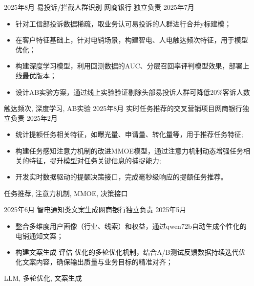 %
%


 
\begin{experiences}
			
 \experience
    {2025年8月}   {易投诉/拦截人群识别} {网商银行} {独立负责}
    {2025年7月} {
                      \begin{itemize}
                        \item 针对工信部投诉数据稀疏，取业务认可易投诉的人群进行合并y标建模；
                        \item 在客户特征基础上，针对电销场景，构建智电、人电触达频次特征，用于模型优化；
                        \item 构建深度学习模型，利用回测数据的AUC、分层召回率评判模型效果，部署上线最优版本；
                        \item 设计AB实验方案，通过线上实验验证剔除头部易投诉人群可降低20\%客诉人数                                                                                        
                      \end{itemize}
                    }
                    {触达频次, 深度学习, AB实验}
  \emptySeparator
  \experience
    { 2025年8月} {实时任务推荐的交叉营销项目}{网商银行}{独立负责}
    {2025年2月}    {
                      \begin{itemize}
                        \item 统计提额任务相关特征，如曝光量、申请量、转化量等，用于推荐任务特征; 
                        \item 构建任务感知注意力机制的改进MMOE模型，通过注意力机制动态增强任务相关的特征，提升模型对任务关键信息的捕捉能力;
                        \item 开发实时数据驱动的提额决策接口，完成毫秒级响应的提额任务推荐。                                                                                         
                      \end{itemize}
                    }
                    {任务推荐, 注意力机制, MMOE, 决策接口}
	
  \emptySeparator
  \experience
  {2025年6月} {智电通知类文案生成}{网商银行}{独立负责}
  {2025年5月 }    {
				  	\begin{itemize}
				  		\item 整合多维度用户画像（行业、线索）和权益，通过qwen72b自动生成个性化的电销通知文案；
				  		\item 构建文案生成-评估-优化的多轮优化机制，结合A/B测试反馈数据持续迭代优化文案内容，确保输出质量与业务目标的精准对齐；
				  	\end{itemize}
				  }
				  {LLM, 多轮优化, 文案生成}


\end{experiences}
